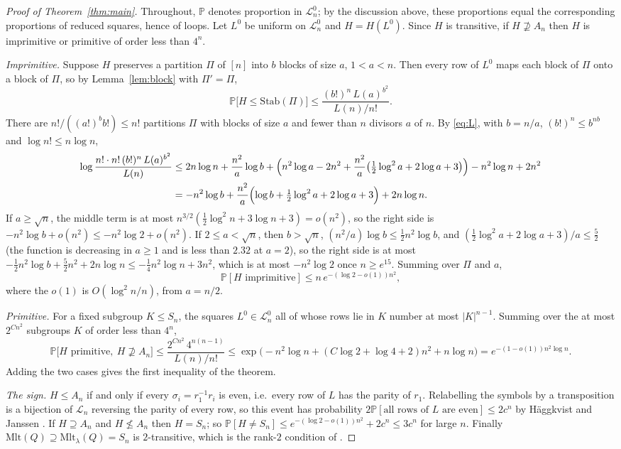 \documentclass[11pt]{amsart}
\theoremstyle{plain}
\theoremstyle{remark}
\newcommand{\Mlt}{\mathrm{Mlt}}
\newcommand{\Stab}{\mathrm{Stab}}
\renewcommand{\Pr}{\mathbb{P}}
\newcommand{\LL}{\mathcal{L}}
\begin{document}
\begin{proof}[Proof of Theorem~\ref{thm:main}]
Throughout, $\Pr$ denotes proportion in $\LL_n^0$; by the discussion above,
these proportions equal the corresponding proportions of reduced squares, hence of loops.
Let $L^0$ be uniform on $\LL_n^0$ and $H=H(L^0)$. Since $H$ is
transitive, if $H\not\supseteq A_n$ then $H$ is imprimitive or
primitive of order less than $4^n$.

\emph{Imprimitive.}  Suppose $H$ preserves a partition $\Pi$ of $[n]$
into $b$ blocks of size $a$, $1<a<n$.  Then every row of $L^0$ maps
each block of $\Pi$ onto a block of $\Pi$, so by Lemma~\ref{lem:block}
with $\Pi'=\Pi$,
\[
\Pr\bigl[H\le\Stab(\Pi)\bigr]\le\frac{(b!)^n\,L(a)^{b^2}}{L(n)/n!}.
\]
There are $n!/((a!)^bb!)\le n!$ partitions $\Pi$ with blocks of size $a$
and fewer than $n$ divisors $a$ of $n$.  By \eqref{eq:L}, with $b=n/a$,
$(b!)^n\le b^{nb}$ and $\log n!\le n\log n$,
\begin{align*}
\log\frac{n!\cdot n!\,(b!)^n\,L(a)^{b^2}}{L(n)}
&\le2n\log n+\frac{n^2}a\log b+\Bigl(n^2\log a-2n^2+\frac{n^2}a\bigl(\tfrac12\log^2a+2\log a+3\bigr)\Bigr)-n^2\log n+2n^2\\
&=-n^2\log b+\frac{n^2}a\Bigl(\log b+\tfrac12\log^2a+2\log a+3\Bigr)+2n\log n.
\end{align*}
If $a\ge\sqrt n$, the middle term is at most
$n^{3/2}(\frac12\log^2n+3\log n+3)=o(n^2)$, so the right side is
$-n^2\log b+o(n^2)\le-n^2\log2+o(n^2)$.  If $2\le a<\sqrt n$, then
$b>\sqrt n$, $(n^2/a)\log b\le\frac12n^2\log b$, and
$(\frac12\log^2a+2\log a+3)/a\le\frac52$ (the function is decreasing in
$a\ge1$ and is less than $2.32$ at $a=2$), so the right side is at most
$-\frac12n^2\log b+\frac52n^2+2n\log n\le-\frac14n^2\log n+3n^2$, which
is at most $-n^2\log2$ once $n\ge e^{15}$.  Summing over $\Pi$ and $a$,
\[
\Pr[H\text{ imprimitive}]\le n\,e^{-(\log2-o(1))n^2},
\]
where the $o(1)$ is $O(\log^2n/n)$, from $a=n/2$.

\emph{Primitive.}  For a fixed subgroup $K\le S_n$, the squares
$L^0\in\LL_n^0$ all of whose rows lie in $K$ number at most $|K|^{n-1}$.
Summing over the at most $2^{Cn^2}$ subgroups $K$ of order less than
$4^n$,
\[
\Pr\bigl[H\text{ primitive},\ H\not\supseteq A_n\bigr]
\le\frac{2^{Cn^2}\,4^{n(n-1)}}{L(n)/n!}
\le\exp\bigl(-n^2\log n+(C\log2+\log4+2)n^2+n\log n\bigr)
=e^{-(1-o(1))n^2\log n}.
\]
Adding the two cases gives the first inequality of the theorem.

\emph{The sign.}  $H\le A_n$ if and only if every $\sigma_i=r_1^{-1}r_i$
is even, i.e.\ every row of $L$ has the parity of $r_1$.  Relabelling
the symbols by a transposition is a bijection of $\LL_n$ reversing the
parity of every row, so this event has probability
$2\Pr[\text{all rows of }L\text{ are even}]\le2c^n$ by
H\"aggkvist and Janssen \cite{HJ96}.  If $H\supseteq A_n$ and
$H\not\le A_n$ then $H=S_n$; so $\Pr[H\ne S_n]\le e^{-(\log2-o(1))n^2}+2c^n\le3c^n$
for large $n$.  Finally $\Mlt(Q)\supseteq\Mlt_\lambda(Q)=S_n$ is
$2$-transitive, which is the rank-$2$ condition of \cite{Smith}.
\end{proof}
\end{document}
